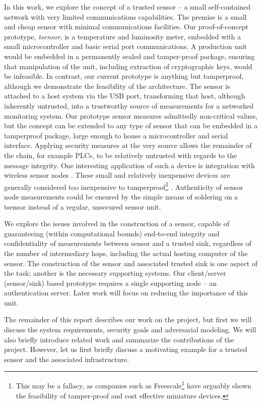 In this work, we explore the concept of a trusted sensor -- a small self-contained network with very limited communications capabilities. The premise is a small and cheap sensor with minimal communications facilities. Our proof-of-concept prototype, \textit{tsensor},  is a temperature and luminosity meter, embedded with a small microcontroller and basic serial port communications. A production unit would be embedded in a permanently sealed and tamper-proof package, ensuring that manipulation of the unit, including extraction of cryptographic keys, would be infeasible. In contrast, our current prototype is anything but tamperproof, although we demonstrate the feasibility of the architecture. The sensor is attached to a host system via the USB port, transforming that host, although inherently untrusted, into a trustworthy source of measurements for a networked monitoring system.
%
Our prototype sensor measures admittedly non-critical values, but the concept can be extended to any type of sensor that can be embedded in a tamperproof package, large enough to house a microcontroller and serial interface. Applying security measures at the very source allows the remainder of the chain, for example PLCs, to be relatively untrusted with regards to the message integrity. One interesting application of such a device is integration with wireless sensor nodes \cite{}. These small and relatively inexpensive devices are generally considered too inexpensive to tamperproof\footnote{This may be a fallacy, as companies such as Freescale\footnote{\url{http://www.freescale.com}} have arguably shown the feasibility of tamper-proof and cost effective miniature devices.} \cite{}. Authenticity of sensor node measurements could be ensured by the simple means of soldering on a tsensor instead of a regular, unsecured sensor unit.

We explore the issues involved in the construction of a sensor, capable of guaranteeing (within computational bounds) end-to-end integrity and confidentiality of measurements between sensor and a trusted sink, regardless of the number of intermediary hops, including the actual hosting computer of the sensor. The construction of the sensor and associated trusted sink is one aspect of the task; another is the necessary supporting systems. Our client/server (sensor/sink) based prototype requires a single supporting node -- an authentication server. Later work will focus on reducing the importance of this unit.

The remainder of this report describes our work on the project, but first we will discuss the system requirements, security goals and adversarial modeling. We will also briefly introduce related work and summarize the contributions of the project. However, let us first briefly discuss a motivating example for a trusted sensor and the associated infrastructure.



